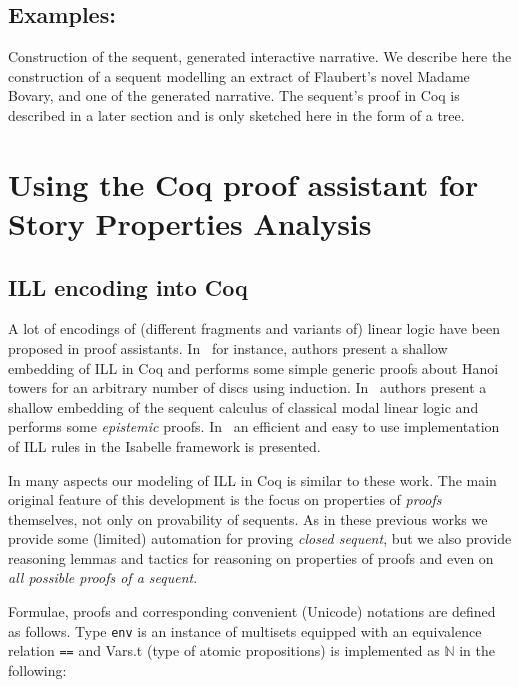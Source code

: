\documentclass[runningheads,a4paper]{llncs}
\newcommand{\N}{\mathbb{N}}
\begin{document}
\subsection{Examples:} Construction of the sequent, generated interactive narrative.
We describe here the construction of a sequent modelling an extract of Flaubert's novel Madame Bovary, and one of the generated narrative. The sequent's proof in Coq is described in a later section and is only sketched here in the form of a tree.
\section{Using the Coq proof assistant for Story Properties Analysis}
\subsection{ILL encoding into Coq}
\label{sec:ill-encoding-into}

A lot of encodings of (different fragments and variants of) linear
logic have been proposed in proof assistants. In~\cite{Power99} for
instance, authors present a shallow embedding of ILL in Coq and
performs some simple generic proofs about Hanoi towers for an
arbitrary number of discs using induction.
In~\cite{Sadrzadeh03modallinear} authors present a shallow embedding
of the sequent calculus of classical modal linear logic and performs
some \emph{epistemic} proofs. In~\cite{Kalvala95mechanizinglinear} an
efficient and easy to use implementation of ILL rules in the Isabelle
framework is presented.

In many aspects our modeling of ILL in Coq is similar to these work.
The main original feature of this development is the focus on
properties of \emph{proofs} themselves, not only on provability of
sequents. As in these previous works we provide some (limited)
automation for proving \emph{closed sequent}, but we also provide reasoning lemmas and tactics
for reasoning on properties of proofs and even on \emph{all possible
  proofs of a sequent}. 


Formulae, proofs and corresponding convenient (Unicode) notations are
defined as follows. Type \texttt{env} is an instance of multisets
equipped with an equivalence relation \texttt{==} and Vars.t (type of
atomic propositions) is implemented as $\N$ in the following:
\end{document}
